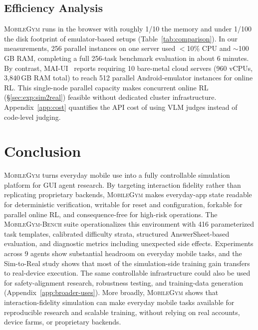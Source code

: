 \documentclass[11pt]{article}
\newcommand{\sys}{\textsc{MobileGym}}
\newcommand{\bench}{\textsc{MobileGym-Bench}}
\begin{document}
\subsection{Efficiency Analysis}\label{sec:exp:efficiency}

\sys{} runs in the browser with roughly 1/10 the memory and under 1/100 the disk footprint of emulator-based setups (Table~\ref{tab:comparison}). In our measurements, 256 parallel instances on one server used $<$10\% CPU and $\sim$100\,GB RAM, completing a full 256-task benchmark evaluation in about 6 minutes. By contrast, MAI-UI~\cite{MAIUI} reports requiring 10 bare-metal cloud servers (960 vCPUs, 3{,}840\,GB RAM total) to reach 512 parallel Android-emulator instances for online RL. This single-node parallel capacity makes concurrent online RL (§\ref{sec:exp:sim2real}) feasible without dedicated cluster infrastructure. Appendix~\ref{app:cost} quantifies the API cost of using VLM judges instead of code-level judging.


\section{Conclusion}\label{sec:conclusion}

\sys{} turns everyday mobile use into a fully controllable simulation platform for GUI agent research. By targeting interaction fidelity rather than replicating proprietary backends, \sys{} makes everyday-app state readable for deterministic verification, writable for reset and configuration, forkable for parallel online RL, and consequence-free for high-risk operations. The \bench{} suite operationalizes this environment with 416 parameterized task templates, calibrated difficulty strata, structured AnswerSheet-based evaluation, and diagnostic metrics including unexpected side effects. Experiments across 9 agents show substantial headroom on everyday mobile tasks, and the Sim-to-Real study shows that most of the simulation-side training gain transfers to real-device execution. The same controllable infrastructure could also be used for safety-alignment research, robustness testing, and training-data generation (Appendix~\ref{app:broader-uses}). More broadly, \sys{} shows that interaction-fidelity simulation can make everyday mobile tasks available for reproducible research and scalable training, without relying on real accounts, device farms, or proprietary backends.
\end{document}
